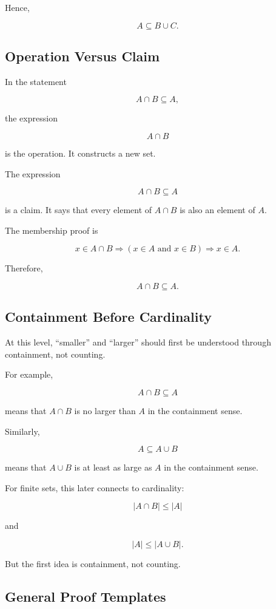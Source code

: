 \documentclass{article}
\begin{document}
	Hence,
	
	\[
	A \subseteq B \cup C.
	\]
	
	\subsection{Operation Versus Claim}
	
	In the statement
	
	\[
	A \cap B \subseteq A,
	\]
	
	the expression
	
	\[
	A \cap B
	\]
	
	is the operation. It constructs a new set.
	
	The expression
	
	\[
	A \cap B \subseteq A
	\]
	
	is a claim. It says that every element of \(A \cap B\) is also an element of \(A\).
	
	The membership proof is
	
	\[
	x \in A \cap B
	\Rightarrow
	(x \in A \text{ and } x \in B)
	\Rightarrow
	x \in A.
	\]
	
	Therefore,
	
	\[
	A \cap B \subseteq A.
	\]
	
	\subsection{Containment Before Cardinality}
	
	At this level, ``smaller'' and ``larger'' should first be understood through containment, not counting.
	
	For example,
	
	\[
	A \cap B \subseteq A
	\]
	
	means that \(A \cap B\) is no larger than \(A\) in the containment sense.
	
	Similarly,
	
	\[
	A \subseteq A \cup B
	\]
	
	means that \(A \cup B\) is at least as large as \(A\) in the containment sense.
	
	For finite sets, this later connects to cardinality:
	
	\[
	|A \cap B| \leq |A|
	\]
	
	and
	
	\[
	|A| \leq |A \cup B|.
	\]
	
	But the first idea is containment, not counting.
	
	\subsection{General Proof Templates}
	
\end{document}

